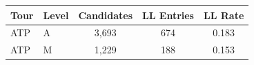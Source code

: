 \begin{tabular}{llccc}
\toprule
Tour & Level & Candidates & LL Entries & LL Rate \\
\midrule
ATP & A & 3,693 & 674 & 0.183 \\
ATP & M & 1,229 & 188 & 0.153 \\
\bottomrule
\end{tabular}
